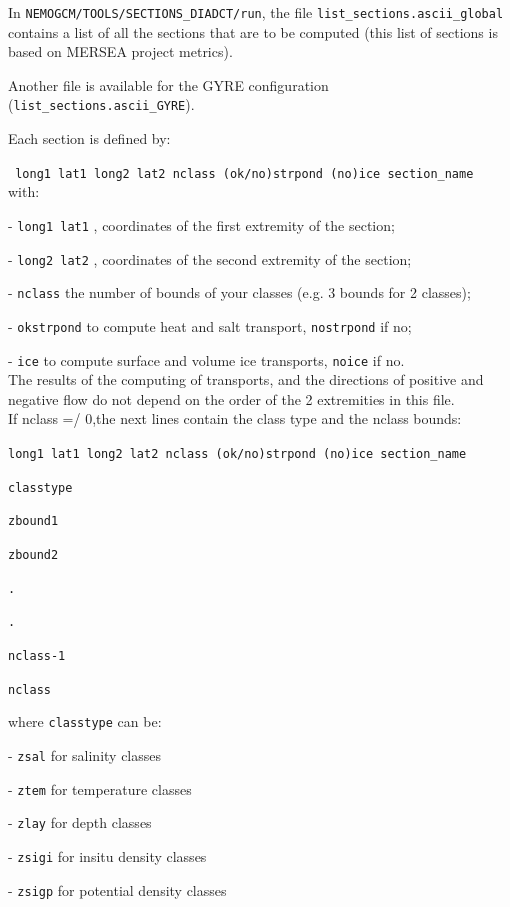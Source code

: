 In \texttt{NEMOGCM/TOOLS/SECTIONS\_DIADCT/run}, the file \texttt{ {list\_sections.ascii\_global}}
contains a list of all the sections that are to be computed (this list of sections is based on MERSEA project metrics).

Another file is available for the GYRE configuration (\texttt{ {list\_sections.ascii\_GYRE}}). 

Each section is defined by:

\noindent \texttt{ long1 lat1 long2 lat2 nclass (ok/no)strpond (no)ice section\_name }\\
with:

- \texttt{long1 lat1} , coordinates of the first extremity of the section;

- \texttt{long2 lat2} , coordinates of the second extremity of the section;

- \texttt{nclass} the number of bounds of your classes (e.g. 3 bounds for 2 classes);

- \texttt{okstrpond} to compute heat and salt transport, \texttt{nostrpond} if no;

- \texttt{ice}  to compute surface and volume ice transports, \texttt{noice} if no. \\


\noindent The results of the computing of transports, and the directions of positive
 and negative flow do not depend on the order of the 2 extremities in this file.\\ 


\noindent If nclass =/ 0,the next lines contain the class type and the nclass bounds:

\texttt{long1 lat1 long2 lat2 nclass (ok/no)strpond (no)ice section\_name}

\texttt{classtype}

\texttt{zbound1}

\texttt{zbound2}

\texttt{.}

\texttt{.}

\texttt{nclass-1}

\texttt{nclass}

\noindent where \texttt{classtype} can be:

- \texttt{zsal} for salinity classes

- \texttt{ztem} for temperature classes

- \texttt{zlay} for depth classes

- \texttt{zsigi} for insitu density classes

- \texttt{zsigp} for potential density classes \\

